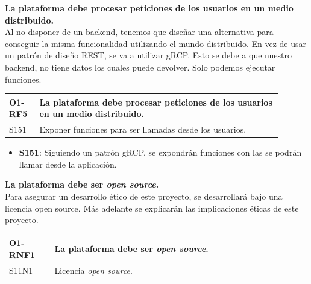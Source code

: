 \textbf{La plataforma debe procesar peticiones de los usuarios en un medio distribuido.}\\
Al no disponer de un backend, tenemos que diseñar una alternativa para conseguir la misma funcionalidad utilizando el mundo distribuido. En vez de usar un patrón de diseño REST, se va a utilizar gRCP. Esto se debe a que nuestro backend, no tiene datos los cuales puede devolver. Solo podemos ejecutar funciones.
\begin{center}
    \begin{table}[h!]
        \begin{tabular}{|p{0.1\linewidth} | p{0.8\linewidth}|}
            \hline
            \rowcolor{Gray}
            \textbf{O1-RF5} & \textbf{La plataforma debe procesar peticiones de los usuarios en un medio distribuido.} \\
            \hline
            S151            & Exponer funciones para ser llamadas desde los usuarios. \\
            \hline
        \end{tabular}
    \end{table}
\end{center}
\begin{itemize}
    \item \textbf{S151}: Siguiendo un patrón gRCP, se expondrán funciones con las se podrán llamar desde la aplicación.
\end{itemize}
\textbf{La plataforma debe ser \textit{open source}.}\\
Para asegurar un desarrollo ético de este proyecto, se desarrollará bajo una licencia open source. Más adelante se explicarán las implicaciones éticas de este proyecto.
\begin{center}
    \begin{table}[h!]
        \begin{tabular}{|p{0.15\linewidth} | p{0.75\linewidth}|}
            \hline
            \rowcolor{Gray} 
            \textbf{O1-RNF1} & \textbf{La plataforma debe ser \textit{open source}.} \\
            \hline
            S11N1            & Licencia \textit{open source}. \\
            \hline
        \end{tabular}
    \end{table}
\end{center}
